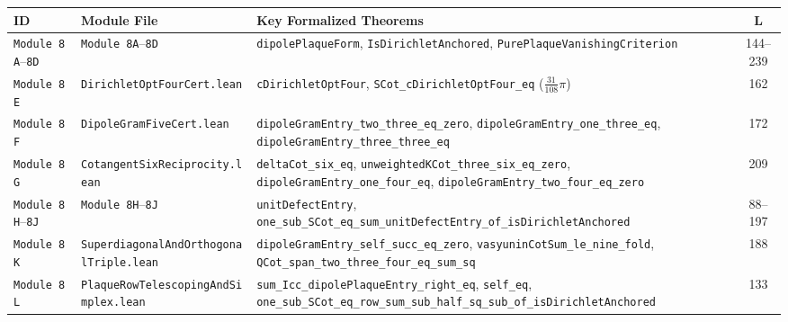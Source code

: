 \documentclass[10pt,a4paper]{article}
\theoremstyle{definition}
\begin{document}
\begin{table}[ht]
\centering
\scriptsize
\setlength{\tabcolsep}{3.2pt}
\begin{tabular}{@{}l>{\raggedright\arraybackslash}p{4.9cm}>{\raggedright\arraybackslash}p{7.1cm}c@{}}
\toprule
ID & Module File & Key Formalized Theorems & L \\
\midrule
\texttt{Module~8A}--\texttt{8D} & \texttt{Module~8A}--\texttt{8D} & \texttt{dipolePlaqueForm}, \texttt{IsDirichletAnchored}, \texttt{PurePlaqueVanishingCriterion} & 144--239 \\
\texttt{Module~8E} & \texttt{DirichletOptFourCert.lean} & \texttt{cDirichletOptFour}, \texttt{SCot\_\allowbreak cDirichletOptFour\_eq} ($\tfrac{31}{108}\pi$) & 162 \\
\texttt{Module~8F} & \texttt{DipoleGramFiveCert.lean} & \texttt{dipoleGramEntry\_\allowbreak two\_three\_eq\_zero}, \texttt{dipoleGramEntry\_\allowbreak one\_three\_eq}, \texttt{dipoleGramEntry\_\allowbreak three\_three\_eq} & 172 \\
\texttt{Module~8G} & \texttt{CotangentSixReciprocity.lean} & \texttt{deltaCot\_six\_eq}, \texttt{unweightedKCot\_\allowbreak three\_six\_eq\_zero}, \texttt{dipoleGramEntry\_\allowbreak one\_four\_eq}, \texttt{dipoleGramEntry\_\allowbreak two\_four\_eq\_zero} & 209 \\
\texttt{Module~8H}--\texttt{8J} & \texttt{Module~8H}--\texttt{8J} & \texttt{unitDefectEntry}, \texttt{one\_sub\_SCot\_\allowbreak eq\_sum\_\allowbreak unitDefectEntry\_\allowbreak of\_isDirichletAnchored} & 88--197 \\
\texttt{Module~8K} & \texttt{SuperdiagonalAndOrthogonalTriple.lean} & \texttt{dipoleGramEntry\_\allowbreak self\_succ\_\allowbreak eq\_zero}, \texttt{vasyuninCotSum\_\allowbreak le\_nine\_fold}, \texttt{QCot\_span\_\allowbreak two\_three\_four\_eq\_sum\_sq} & 188 \\
\texttt{Module~8L} & \texttt{PlaqueRowTelescopingAndSimplex.lean} & \texttt{sum\_Icc\_\allowbreak dipolePlaqueEntry\_\allowbreak right\_eq}, \texttt{self\_eq}, \texttt{one\_sub\_SCot\_\allowbreak eq\_row\_sum\_sub\_\allowbreak half\_sq\_sub\_\allowbreak of\_isDirichletAnchored} & 133 \\

\end{tabular}
\end{table}
\end{document}
